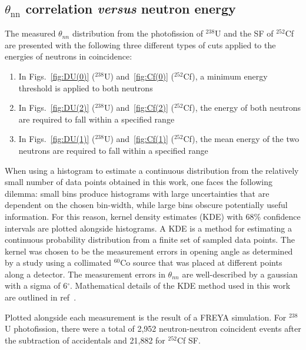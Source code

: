 \subsection{$\theta_{\text{nn}}$ correlation \emph{versus} neutron energy}
The measured $\theta_{nn}$ distribution from the photofission of $^{238}$U and the SF of $^{252}$Cf are presented with the following three different types of cuts applied to the energies of neutrons in coincidence:
\begin{enumerate}[label=(\roman*), itemjoin={{, }}, itemjoin*={{, or }}]
    \item In Figs.~\ref{fig:DU(0)} ($^{238}$U) and~\ref{fig:Cf(0)} ($^{252}$Cf), a minimum energy threshold is applied to both neutrons
    \item In Figs.~\ref{fig:DU(2)} ($^{238}$U) and~\ref{fig:Cf(2)} ($^{252}$Cf), the energy of both neutrons are required to fall within a specified range
  \item In Figs.~\ref{fig:DU(1)} ($^{238}$U) and~\ref{fig:Cf(1)} ($^{252}$Cf), the mean energy of the two neutrons are required to fall within a specified range
 \end{enumerate}

When using a histogram to estimate a continuous distribution from the relatively small number of data points obtained in this work, one faces the following dilemma: small bins produce histograms with large uncertainties that are dependent on the chosen bin-width, while large bins obscure potentially useful information. 
For this reason, kernel density estimates (KDE) with 68\% confidence intervals are plotted alongside histograms.
A KDE is a method for estimating a continuous probability distribution from a finite set of sampled data points.
The kernel was chosen to be the measurement errors in opening angle as determined by a study using a collimated $^{60}$Co source that was placed at different points along a detector.
The measurement errors in $\theta_{nn}$ are well-described by a gaussian with a sigma of 6$^{\circ}$.
Mathematical details of the KDE method used in this work are outlined in ref~\cite{KDE}. 

Plotted alongside each measurement is the result of a FREYA simulation.
For $^{238}$U photofission, there were a total of 2,952 neutron-neutron coincident events after the subtraction of accidentals and 21,882 for $^{252}$Cf SF.

